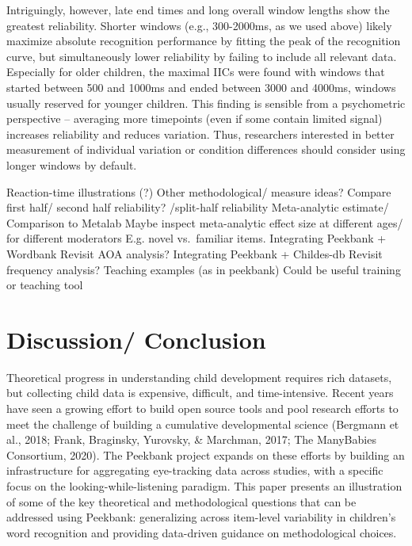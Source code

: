 \documentclass[
  english,
  man]{apa6}
\begin{document}
Intriguingly, however, late end times and long overall window lengths show the greatest reliability. Shorter windows (e.g., 300-2000ms, as we used above) likely maximize absolute recognition performance by fitting the peak of the recognition curve, but simultaneously lower reliability by failing to include all relevant data. Especially for older children, the maximal IICs were found with windows that started between 500 and 1000ms and ended between 3000 and 4000ms, windows usually reserved for younger children. This finding is sensible from a psychometric perspective -- averaging more timepoints (even if some contain limited signal) increases reliability and reduces variation. Thus, researchers interested in better measurement of individual variation or condition differences should consider using longer windows by default.

Reaction-time illustrations (?)
Other methodological/ measure ideas?
Compare first half/ second half reliability? /split-half reliability
Meta-analytic estimate/ Comparison to Metalab
Maybe inspect meta-analytic effect size at different ages/ for different moderators
E.g. novel vs.~familiar items.
Integrating Peekbank + Wordbank
Revisit AOA analysis?
Integrating Peekbank + Childes-db
Revisit frequency analysis?
Teaching examples (as in peekbank)
Could be useful training or teaching tool

\hypertarget{discussion-conclusion}{%
\section{Discussion/ Conclusion}\label{discussion-conclusion}}

Theoretical progress in understanding child development requires rich datasets, but collecting child data is expensive, difficult, and time-intensive. Recent years have seen a growing effort to build open source tools and pool research efforts to meet the challenge of building a cumulative developmental science (Bergmann et al., 2018; Frank, Braginsky, Yurovsky, \& Marchman, 2017; The ManyBabies Consortium, 2020). The Peekbank project expands on these efforts by building an infrastructure for aggregating eye-tracking data across studies, with a specific focus on the looking-while-listening paradigm. This paper presents an illustration of some of the key theoretical and methodological questions that can be addressed using Peekbank: generalizing across item-level variability in children's word recognition and providing data-driven guidance on methodological choices.
\end{document}
